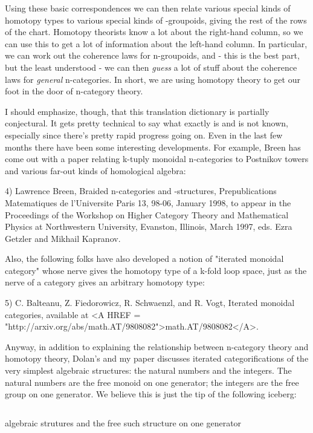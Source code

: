 Using these basic correspondences we can then relate various special
kinds of homotopy types to various special kinds of \omega -groupoids,
giving the rest of the rows of the chart.  Homotopy theorists know a
lot about the right-hand column, so we can use this to get a lot of
information about the left-hand column.  In particular, we can work
out the coherence laws for n-groupoids, and - this is the best part,
but the least understood - we can then \emph{guess} a lot of stuff about
the coherence laws for \emph{general} n-categories.  In short, we are using
homotopy theory to get our foot in the door of n-category theory.

I should emphasize, though, that this translation dictionary is
partially conjectural.  It gets pretty technical to say what exactly
is and is not known, especially since there's pretty rapid progress
going on.  Even in the last few months there have been some
interesting developments.  For example, Breen has come out with a
paper relating k-tuply monoidal n-categories to Postnikov towers and
various far-out kinds of homological algebra:

4) Lawrence Breen, Braided n-categories and \Sigma -structures,
Prepublications Matematiques de l'Universite Paris 13, 98-06,
January 1998, to appear in the Proceedings of the Workshop on
Higher Category Theory and Mathematical Physics at Northwestern
University, Evanston, Illinois, March 1997, eds. Ezra Getzler
and Mikhail Kapranov.

Also, the following folks have also developed a notion of "iterated
monoidal category" whose nerve gives the homotopy type of a k-fold
loop space, just as the nerve of a category gives an arbitrary
homotopy type:

5) C. Balteanu, Z. Fiedorowicz, R. Schwaenzl, and R. Vogt, Iterated
monoidal categories, available at <A HREF = 
"http://arxiv.org/abs/math.AT/9808082">math.AT/9808082</A>.

Anyway, in addition to explaining the relationship between n-category
theory and homotopy theory, Dolan's and my paper discusses iterated
categorifications of the very simplest algebraic structures: the
natural numbers and the integers.  The natural numbers are the free
monoid on one generator; the integers are the free group on one
generator.  We believe this is just the tip of the following iceberg:

$$

  algebraic strutures and the free such structure on one generator

